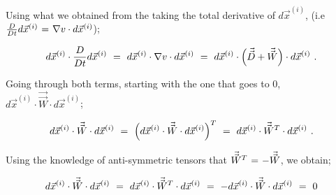 \documentclass{article}
\begin{document}
Using what we obtained from the taking the total derivative of \begin{math} d \vec{x}^{(i)} \end{math}, (i.e \begin{math} \frac{D}{D t} d \vec{x}^{(i)} \hspace{0.025cm} = \hspace{0.025cm} \nabla{v} \cdot d \vec{x}^{(i)} \end{math}); 

\begin{equation} \label{eq:1}
d \vec{x}^{(i)} \cdot \frac{D}{D t} d \vec{x}^{(i)} \hspace{0.125cm} = \hspace{0.125cm} d \vec{x}^{(i)} \cdot  \nabla{v} \cdot d \vec{x}^{(i)} \hspace{0.125cm} = \hspace{0.125cm} d \vec{x}^{(i)} \cdot \Big( \vec{\vec{D}} + \vec{\vec{W}} \Big) \cdot d \vec{x}^{(i)} \hspace{0.125cm} . 
\end{equation} 

Going through both terms, starting with the one that goes to 0, \begin{math} d \vec{x}^{(i)} \cdot \vec{\vec{W}} \cdot d \vec{x}^{(i)} \end{math};

\begin{equation} \label{eq:1}
d \vec{x}^{(i)} \cdot \vec{\vec{W}} \cdot d \vec{x}^{(i)} \hspace{0.125cm} = \hspace{0.125cm} \Big( d \vec{x}^{(i)} \cdot \vec{\vec{W}} \cdot d \vec{x}^{(i)} \Big)^T \hspace{0.125cm} = \hspace{0.125cm} d \vec{x}^{(i)} \cdot \vec{\vec{W}}^T \cdot d \vec{x}^{(i)} \hspace{0.125cm} . 
\end{equation} 

Using the knowledge of anti-symmetric tensors that \begin{math} \vec{\vec{W}}^T \hspace{0.025cm} = \hspace{0.025cm} - \vec{\vec{W}} \end{math}, we obtain;

\begin{equation} \label{eq:1}
d \vec{x}^{(i)} \cdot \vec{\vec{W}} \cdot d \vec{x}^{(i)} \hspace{0.125cm} = \hspace{0.125cm} d \vec{x}^{(i)} \cdot \vec{\vec{W}}^T \cdot d \vec{x}^{(i)} \hspace{0.125cm} = \hspace{0.125cm} - d \vec{x}^{(i)} \cdot \vec{\vec{W}} \cdot d \vec{x}^{(i)} \hspace{0.125cm} = \hspace{0.125cm} 0
\end{equation} 
\end{document}
